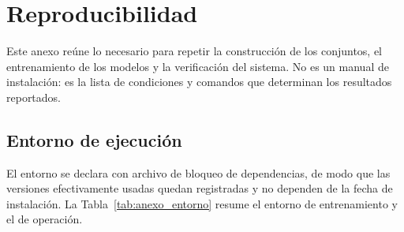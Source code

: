 \chapter{Reproducibilidad}

Este anexo reúne lo necesario para repetir la construcción de los conjuntos, el
entrenamiento de los modelos y la verificación del sistema. No es un manual de
instalación: es la lista de condiciones y comandos que determinan los resultados
reportados.

\section{Entorno de ejecución}

El entorno se declara con archivo de bloqueo de dependencias, de modo que las
versiones efectivamente usadas quedan registradas y no dependen de la fecha de
instalación. La Tabla~\ref{tab:anexo_entorno} resume el entorno de entrenamiento y
el de operación.

